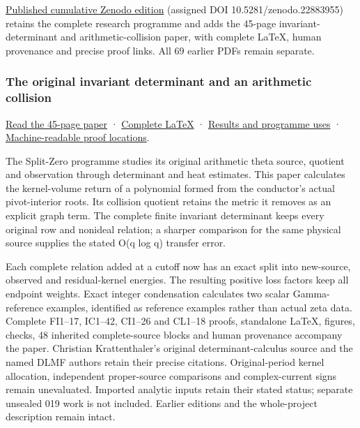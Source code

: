 \documentclass[
]{article}
\begin{document}
\href{https://zenodo.org/records/22883955}{Published cumulative Zenodo
edition} (assigned DOI 10.5281/zenodo.22883955) retains the complete
research programme and adds the 45-page invariant-determinant and
arithmetic-collision paper, with complete LaTeX, human provenance and
precise proof links. All 69 earlier PDFs remain separate.

\subsubsection{The original invariant determinant and an arithmetic
collision}\label{the-original-invariant-determinant-and-an-arithmetic-collision}

\href{https://github.com/KokunoYumeto/zeta-function-research-reader/blob/main/workbenches/splitzero-tandem/continuations/20260921-invariant-collision/INVARIANT_DETERMINANT_COLLISION_READER.pdf}{Read
the 45-page paper} ·
\href{https://github.com/KokunoYumeto/zeta-function-research-reader/blob/main/workbenches/splitzero-tandem/continuations/20260921-invariant-collision/INVARIANT_DETERMINANT_COLLISION_READER.tex}{Complete
LaTeX} ·
\href{https://github.com/KokunoYumeto/zeta-function-research-reader/blob/main/workbenches/splitzero-tandem/continuations/20260921-invariant-collision/RESULTS_20260921_018.md}{Results
and programme uses} ·
\href{https://github.com/KokunoYumeto/zeta-function-research-reader/blob/main/workbenches/splitzero-tandem/continuations/20260921-invariant-collision/RESULT_INDEX.json}{Machine-readable
proof locations}.

The Split-Zero programme studies its original arithmetic theta source,
quotient and observation through determinant and heat estimates. This
paper calculates the kernel-volume return of a polynomial formed from
the conductor's actual pivot-interior roots. Its collision quotient
retains the metric it removes as an explicit graph term. The complete
finite invariant determinant keeps every original row and nonideal
relation; a sharper comparison for the same physical source supplies the
stated O(q log q) transfer error.

Each complete relation added at a cutoff now has an exact split into
new-source, observed and residual-kernel energies. The resulting
positive loss factors keep all endpoint weights. Exact integer
condensation calculates two scalar Gamma-reference examples, identified
as reference examples rather than actual zeta data. Complete FI1--17,
IC1--42, CI1--26 and CL1--18 proofs, standalone LaTeX, figures, checks,
48 inherited complete-source blocks and human provenance accompany the
paper. Christian Krattenthaler's original determinant-calculus source
and the named DLMF authors retain their precise citations.
Original-period kernel allocation, independent proper-source comparisons
and complex-current signs remain unevaluated. Imported analytic inputs
retain their stated status; separate unsealed 019 work is not included.
Earlier editions and the whole-project description remain intact.
\end{document}
